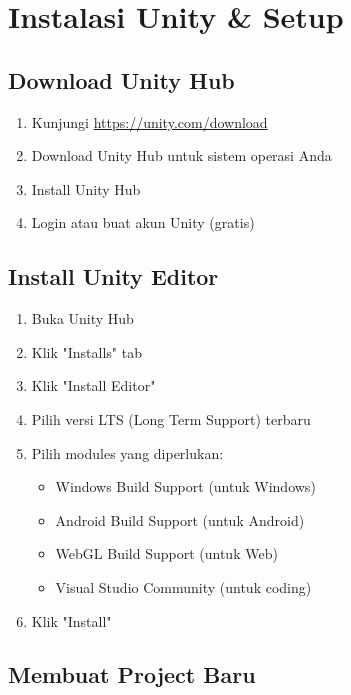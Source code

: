 
\chapter{Instalasi Unity \& Setup}

\section{Download Unity Hub}

\begin{enumerate}
\item Kunjungi \url{https://unity.com/download}
\item Download Unity Hub untuk sistem operasi Anda
\item Install Unity Hub
\item Login atau buat akun Unity (gratis)
\end{enumerate}

\section{Install Unity Editor}

\begin{enumerate}
\item Buka Unity Hub
\item Klik "Installs" tab
\item Klik "Install Editor"
\item Pilih versi LTS (Long Term Support) terbaru
\item Pilih modules yang diperlukan:
   \begin{itemize}
   \item Windows Build Support (untuk Windows)
   \item Android Build Support (untuk Android)
   \item WebGL Build Support (untuk Web)
   \item Visual Studio Community (untuk coding)
   \end{itemize}
\item Klik "Install"
\end{enumerate}

\section{Membuat Project Baru}

